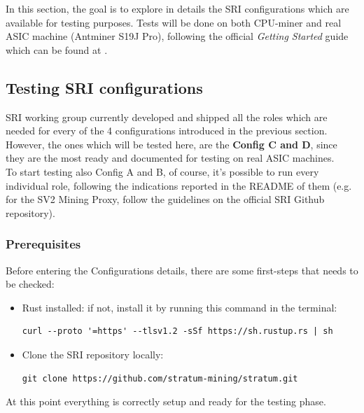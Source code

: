 In this section, the goal is to explore in details the SRI configurations which are available for testing purposes. Tests will be done on both CPU-miner and real ASIC machine (Antminer S19J Pro), following the official \textit{Getting Started} guide which can be found at \cite{stratumprotocolStratumV2}.

\subsection{Testing SRI configurations}
SRI working group currently developed and shipped all the roles which are needed for every of the 4 configurations introduced in the previous section. However, the ones which will be tested here, are the \textbf{Config C and D}, since they are the most ready and documented for testing on real ASIC machines.\\
To start testing also Config A and B, of course, it's possible to run every individual role, following the indications reported in the README of them (e.g. for the SV2 Mining Proxy, follow the guidelines on the official SRI Github repository).\\

\subsubsection{Prerequisites}
Before entering the Configurations details, there are some first-steps that needs to be checked:
\begin{itemize}
    \item Rust installed: if not, install it by running this command in the terminal:
    \begin{lstlisting}[style=bashStyle, numbers=none]
        curl --proto '=https' --tlsv1.2 -sSf https://sh.rustup.rs | sh
    \end{lstlisting}
    \item Clone the SRI repository locally:
    \begin{lstlisting}[style=bashStyle, numbers=none]
        git clone https://github.com/stratum-mining/stratum.git 
    \end{lstlisting}
\end{itemize}
At this point everything is correctly setup and ready for the testing phase.\\

